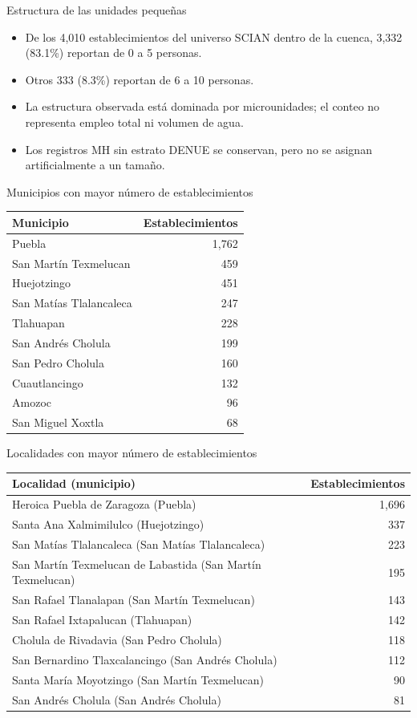 \documentclass[aspectratio=169]{beamer}
\begin{document}
\begin{frame}{Estructura de las unidades pequeñas}
\begin{itemize}
\item De los 4,010 establecimientos del universo SCIAN dentro de la cuenca,
3,332 (83.1\%) reportan de 0 a 5 personas.
\item Otros 333 (8.3\%) reportan de 6 a 10 personas.
\item La estructura observada está dominada por microunidades; el conteo no representa empleo total ni volumen de agua.
\item Los registros MH sin estrato DENUE se conservan, pero no se asignan artificialmente a un tamaño.
\end{itemize}
\end{frame}
\begin{frame}{Municipios con mayor número de establecimientos}
\centering\small
\begin{tabular}{lr}\toprule Municipio & Establecimientos\\\midrule
Puebla & 1,762\\
San Martín Texmelucan & 459\\
Huejotzingo & 451\\
San Matías Tlalancaleca & 247\\
Tlahuapan & 228\\
San Andrés Cholula & 199\\
San Pedro Cholula & 160\\
Cuautlancingo & 132\\
Amozoc & 96\\
San Miguel Xoxtla & 68\\
\bottomrule\end{tabular}
\end{frame}
\begin{frame}{Localidades con mayor número de establecimientos}
\centering\scriptsize
\begin{tabular}{lr}\toprule Localidad (municipio) & Establecimientos\\\midrule
Heroica Puebla de Zaragoza (Puebla) & 1,696\\
Santa Ana Xalmimilulco (Huejotzingo) & 337\\
San Matías Tlalancaleca (San Matías Tlalancaleca) & 223\\
San Martín Texmelucan de Labastida (San Martín Texmelucan) & 195\\
San Rafael Tlanalapan (San Martín Texmelucan) & 143\\
San Rafael Ixtapalucan (Tlahuapan) & 142\\
Cholula de Rivadavia (San Pedro Cholula) & 118\\
San Bernardino Tlaxcalancingo (San Andrés Cholula) & 112\\
Santa María Moyotzingo (San Martín Texmelucan) & 90\\
San Andrés Cholula (San Andrés Cholula) & 81\\
\bottomrule\end{tabular}
\end{frame}
\end{document}
